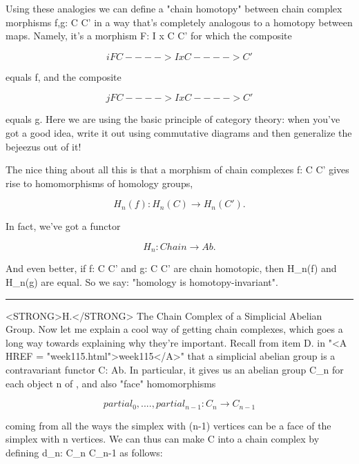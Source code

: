Using these analogies we can define a "chain homotopy" between chain
complex morphisms f,g: C \to  C' in a way that's completely analogous to a
homotopy between maps.  Namely, it's a morphism F: I x C \to  C' for which
the composite


$$

                    i           F
                C ----> I x C ----> C'
$$
    
equals f, and the composite


$$

                    j           F
                C ----> I x C ----> C'
$$
    
equals g.   Here we are using the basic principle of category theory:
when you've got a good idea, write it out using commutative diagrams
and then generalize the bejeezus out of it!  

The nice thing about all this is that a morphism of chain complexes
f: C \to  C' gives rise to homomorphisms of homology groups, 
 

$$

                H_{n}(f): H_{n}(C) \to  H_{n}(C').
$$
    
In fact, we've got a functor

$$

                H_{n}: Chain \to  Ab.
$$
    
And even better, if f: C \to  C' and g: C \to  C' are chain homotopic, then
H_{n}(f) and H_{n}(g) are equal.  So we say: "homology is homotopy-invariant".

\par\noindent\rule{\textwidth}{0.4pt}
<STRONG>H.</STRONG> The Chain Complex of a Simplicial Abelian Group.
Now let me explain a cool way of getting chain complexes, which goes a
long way towards explaining why they're important.  Recall from item
D. in "<A HREF = "week115.html">week115</A>" that a
simplicial abelian group is a contravariant functor C: \Delta  \to 
Ab.  In particular, it gives us an abelian group C_{n} for
each object n of \Delta , and also "face" homomorphisms


$$

         partial_{0}, ...., partial_{n-1}: C_{n} \to  C_{n-1}
$$
    
coming from all the ways the simplex with (n-1) vertices can be a face
of the simplex with n vertices.  We can thus can make C into a chain
complex by defining d_{n}: C_{n} \to  C_{n-1} as follows:
                        

$$

